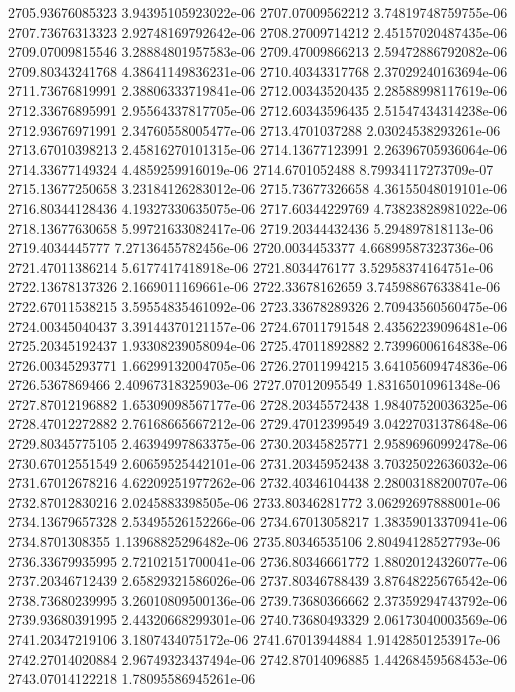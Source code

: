 {2705.93676085323 3.94395105923022e-06
2707.07009562212 3.74819748759755e-06
2707.73676313323 2.92748169792642e-06
2708.27009714212 2.45157020487435e-06
2709.07009815546 3.28884801957583e-06
2709.47009866213 2.59472886792082e-06
2709.80343241768 4.38641149836231e-06
2710.40343317768 2.37029240163694e-06
2711.73676819991 2.38806333719841e-06
2712.00343520435 2.28588998117619e-06
2712.33676895991 2.95564337817705e-06
2712.60343596435 2.51547434314238e-06
2712.93676971991 2.34760558005477e-06
2713.4701037288 2.03024538293261e-06
2713.67010398213 2.45816270101315e-06
2714.13677123991 2.26396705936064e-06
2714.33677149324 4.4859259916019e-06
2714.6701052488 8.79934117273709e-07
2715.13677250658 3.23184126283012e-06
2715.73677326658 4.36155048019101e-06
2716.80344128436 4.19327330635075e-06
2717.60344229769 4.73823828981022e-06
2718.13677630658 5.99721633082417e-06
2719.20344432436 5.294897818113e-06
2719.4034445777 7.27136455782456e-06
2720.0034453377 4.66899587323736e-06
2721.47011386214 5.6177417418918e-06
2721.8034476177 3.52958374164751e-06
2722.13678137326 2.1669011169661e-06
2722.33678162659 3.74598867633841e-06
2722.67011538215 3.59554835461092e-06
2723.33678289326 2.70943560560475e-06
2724.00345040437 3.39144370121157e-06
2724.67011791548 2.43562239096481e-06
2725.20345192437 1.93308239058094e-06
2725.47011892882 2.73996006164838e-06
2726.00345293771 1.66299132004705e-06
2726.27011994215 3.64105609474836e-06
2726.5367869466 2.40967318325903e-06
2727.07012095549 1.83165010961348e-06
2727.87012196882 1.65309098567177e-06
2728.20345572438 1.98407520036325e-06
2728.47012272882 2.76168665667212e-06
2729.47012399549 3.04227031378648e-06
2729.80345775105 2.46394997863375e-06
2730.20345825771 2.95896960992478e-06
2730.67012551549 2.60659525442101e-06
2731.20345952438 3.70325022636032e-06
2731.67012678216 4.62209251977262e-06
2732.40346104438 2.28003188200707e-06
2732.87012830216 2.0245883398505e-06
2733.80346281772 3.06292697888001e-06
2734.13679657328 2.53495526152266e-06
2734.67013058217 1.38359013370941e-06
2734.8701308355 1.13968825296482e-06
2735.80346535106 2.80494128527793e-06
2736.33679935995 2.72102151700041e-06
2736.80346661772 1.88020124326077e-06
2737.20346712439 2.65829321586026e-06
2737.80346788439 3.87648225676542e-06
2738.73680239995 3.26010809500136e-06
2739.73680366662 2.37359294743792e-06
2739.93680391995 2.44320668299301e-06
2740.73680493329 2.06173040003569e-06
2741.20347219106 3.1807434075172e-06
2741.67013944884 1.91428501253917e-06
2742.27014020884 2.96749323437494e-06
2742.87014096885 1.44268459568453e-06
2743.07014122218 1.78095586945261e-06
}
